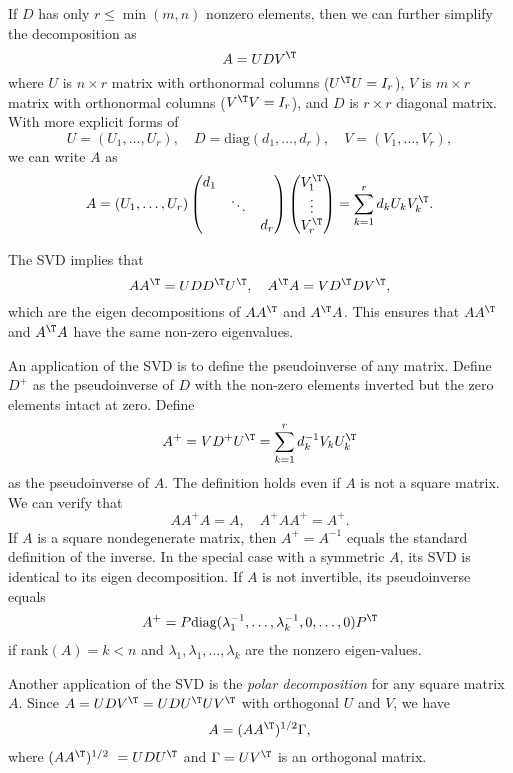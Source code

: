 If $D$ has only $r \leq \min(m,n)$ nonzero elements, then we can further simplify the decomposition as
$$
A = U D  V^{\T}
$$
where $U$ is $n\times r$ matrix with orthonormal columns ($U^{\T} U = I_r$), $V$ is $m \times r$ matrix with orthonormal columns ($V^{\T} V = I_r$), and $D$ is $r\times r$ diagonal matrix. With more explicit forms of 
$$
U = (U_{1}, \ldots, U_{r}), \quad D = \text{diag}(d_1, \ldots, d_r),\quad V =  (V_{1}, \ldots, V_{r}),
$$
we can write $A$ as
$$
A = (U_{1}, \ldots, U_{r}) \begin{pmatrix}
d_1 & &  \\
 &  \ddots & \\
 & & d_r
\end{pmatrix}
\begin{pmatrix}
V_1^{\T} \\
\vdots \\
V_r^{\T}
\end{pmatrix}
= \sum_{k=1}^r  d_k U_k V_k^{\T}. 
$$

The SVD implies that
$$
AA^{\T} = UDD^{\T} U^{\T},\quad
A^{\T} A = V D^{\T}  D V^{\T} ,
$$
which are the eigen decompositions of $AA^{\T}$ and $A^{\T} A $. This ensures that $AA^{\T} $ and $A^{\T} A $ have the same non-zero eigenvalues. 


An application of the SVD is to define the pseudoinverse of any matrix. Define $D^{+}$ as the pseudoinverse of $D$ with the non-zero elements inverted but the zero elements intact at zero. Define
$$
A^{+} = V D^{+} U^{\T} =  \sum_{k=1}^r d_k^{-1} V_k U_k^{\T} 
$$
as the pseudoinverse of $A$. The definition holds even if $A$ is not a square matrix. We can verify that 
$$
AA^{+} A = A, \quad 
A^{+}AA^{+} = A^{+}.
$$
If $A$ is a square nondegenerate matrix, then $A^{+} = A^{-1}$ equals the standard definition of the inverse. 
In the special case with a symmetric $A$, its SVD is identical to its eigen decomposition. If $A$ is not invertible, its pseudoinverse equals
$$
A^{+} = P\text{diag}(\lambda_1^{-1}, \ldots, \lambda_k^{-1}, 0, \ldots, 0) P^{\T} 
$$
if rank$(A) = k < n$ and $\lambda_1,\lambda_1, \ldots, \lambda_k$ are the nonzero eigen-values. 




Another application of the SVD is the  {\it polar decomposition} for any square matrix $A$. Since $A = UDV^{\T} = UDU^{\T} UV^{\T}$ with orthogonal $U$ and $V$, we have
$$
A = (AA^{\T})^{1/2}\Gamma,
$$
where $ (AA^{\T})^{1/2}\ = UDU^{\T} $ and $\Gamma =  UV^{\T}$ is an orthogonal matrix. 


